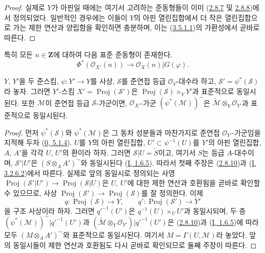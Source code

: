 \begin{proof}
실제로 $Y$가 아핀일 때에는 여기서 고려하는 준동형들이 이미
(\hyperref[II.2.8.7-ko]{2.8.7} 및
\hyperref[II.2.8.8-ko]{2.8.8})에서 정의되었다. 일반적인 경우에는 이들이
$Y$의 아핀 열린집합에서 더 작은 열린집합으로 가는 제한 연산과 양립함을
확인하면 충분하며, 이는
(\hyperref[II.3.5.1.1-ko]{3.5.1.1})의 가환성에서 곧바로 따른다.
\end{proof}

특히 모든 $n\in\mathbf{Z}$에 대하여 다음 표준 준동형이 존재한다.
\[
\label{II.3.5.2.1-ko}
  \Phi^*(\mathcal{O}_{X'}(n))\longrightarrow
  \mathcal{O}_X(n)|G(\varphi).
\tag{3.5.2.1}
\]

\begin{proposition}[3.5.3]
\label{II.3.5.3-ko}
$Y$, $Y'$을 두 준스킴, $\psi:Y'\to Y$를 사상,
$\mathcal{S}$를 준연접 등급 $\mathcal{O}_Y$-대수라 하고,
$\mathcal{S}'=\psi^*(\mathcal{S})$라 놓자. 그러면 $Y'$-스킴
$X'=\operatorname{Proj}(\mathcal{S}')$은
$\operatorname{Proj}(\mathcal{S})\times_Y Y'$과 표준적으로 동일시된다.
또한 $\mathcal{M}$이 준연접 등급 $\mathcal{S}$-가군이면,
$\mathcal{O}_{X'}$-가군 $(\psi^*(\mathcal{M}))^{\sim}$은
$\widetilde{\mathcal{M}}\otimes_Y\mathcal{O}_{Y'}$과 표준적으로 동일시된다.
\end{proposition}

\begin{proof}
먼저 $\psi^*(\mathcal{S})$와 $\psi^*(\mathcal{M})$은 그 동차 성분들과
마찬가지로 준연접 $\mathcal{O}_{Y'}$-가군임을 지적해 두자
(\hyperref[0.5.1.4-ko]{0, 5.1.4}). $U$를 $Y$의 아핀 열린집합,
$U'\subset\psi^{-1}(U)$를 $Y'$의 아핀 열린집합, $A$, $A'$을 각각
$U$, $U'$의 환이라 하자. 그러면 $\mathcal{S}|U=\widetilde{S}$이고,
여기서 $S$는 등급 $A$-대수이며, $\mathcal{S}'|U'$은
$(S\otimes_A A')^{\sim}$와 동일시된다
(\hyperref[I.1.6.5-ko]{I, 1.6.5}). 따라서 첫째 주장은
(\hyperref[II.2.8.10-ko]{2.8.10})과
(\hyperref[I.3.2.6.2-ko]{I, 3.2.6.2})에서 따른다. 실제로 앞의
동일시로 정의되는 사영
$\operatorname{Proj}(\mathcal{S}'|U')\to
\operatorname{Proj}(\mathcal{S}|U)$은 $U$, $U'$에 대한 제한 연산과
호환됨을 곧바로 확인할 수 있으므로, 사상
$\operatorname{Proj}(\mathcal{S}')\to\operatorname{Proj}(\mathcal{S})$를
잘 정의한다. 이제
\[
  q:\operatorname{Proj}(\mathcal{S})\to Y,
  \qquad q':\operatorname{Proj}(\mathcal{S}')\to Y'
\]
을 구조 사상이라 하자. 그러면 $q'^{-1}(U')$은
$q^{-1}(U)\times_U U'$과 동일시되며, 두 층
$(\psi^*(\mathcal{M}))^{\sim}|q'^{-1}(U')$과
$(\widetilde{\mathcal{M}}\otimes_Y\mathcal{O}_{Y'})|q'^{-1}(U')$은
(\hyperref[II.2.8.10-ko]{2.8.10})과
(\hyperref[I.1.6.5-ko]{I, 1.6.5})에 따라 모두
$(M\otimes_A A')^{\sim}$와 표준적으로 동일시된다. 여기서
$M=\Gamma(U,\mathcal{M})$라 놓았다. 앞의 동일시들이 제한 연산과
호환됨도 다시 곧바로 확인되므로 둘째 주장이 따른다.
\end{proof}

